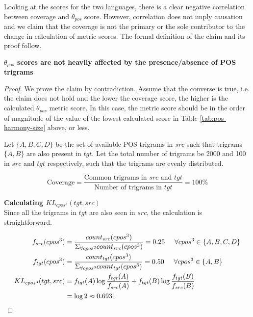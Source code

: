 Looking at the scores for the two languages, there is a clear negative correlation between coverage and \(\theta_{pos}\) score. However, correlation does not imply causation and we claim that the coverage is not the primary or the sole contributor to the change in calculation of metric scores. The formal definition of the claim and its proof follow.

\begin{claim}
\textbf{\(\theta_{pos}\) scores are not heavily affected by the presence/absence of POS trigrams}
\end{claim}
\begin{proof}
We prove the claim by contradiction. Assume that the converse is true, i.e. the claim does not hold and the lower the coverage score, the higher is the calculated \(\theta_{pos}\) metric score. In this case, the metric score should be in the order of magnitude of the value of the lowest calculated score in Table \ref{tab:pos-harmony-size} above, or less.

Let \(\{A, B, C, D\}\) be the set of available POS trigrams in \(src\) such that trigrams \(\{A, B\}\) are also present in \(tgt\). Let the total number of trigrams be 2000 and 100 in \(src\) and  \(tgt\) respectively, such that the trigrams are evenly distributed.

\begin{equation}
    \text{Coverage} = \frac{\text{Common trigrams in } src \text{ and } tgt}{\text{Number of trigrams in } tgt} = 100 \%
\end{equation}

\textbf{Calculating \(KL_{cpos^{3}}(tgt, src)\)}\\

Since all the trigrams in \(tgt\) are also seen in \(src\), the calculation is straightforward.

\begin{align*}
    f_{src}(cpos^{3}) & = \frac{count_{src}(cpos^{3})}{\Sigma_{\forall cpos^{3}} count_{src}(cpos^{3})} = 0.25 \hspace{5mm} \forall cpos^{3} \in \{A, B, C, D\}\\
    f_{tgt}(cpos^{3}) &= \frac{count_{tgt}(cpos^{3})}{\Sigma_{\forall cpos^{3}} count_{tgt}(cpos^{3})} = 0.50 \hspace{5mm} \forall cpos^{3} \in \{A, B\}\\
    KL_{cpos^{3}}(tgt, src) & = f_{tgt}(A) \log \frac{f_{tgt}(A)}{f_{src}(A)} + f_{tgt}(B) \log \frac{f_{tgt}(B)}{f_{src}(B)}\\
    &= \log 2 \approx 0.6931
\end{align*}


\end{proof}
